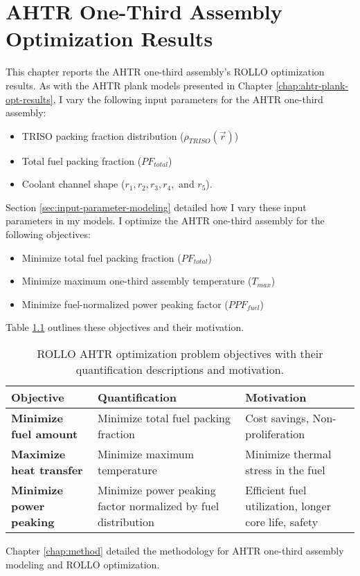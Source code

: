 \chapter{AHTR One-Third Assembly Optimization Results}
\glsresetall
\label{chap:ahtr-assem-opt-results}
This chapter reports the \gls{AHTR} one-third assembly's \gls{ROLLO} optimization 
results. 
As with the \gls{AHTR} plank models presented in Chapter
\ref{chap:ahtr-plank-opt-results}, I vary the following input parameters for the 
\gls{AHTR} one-third assembly:
\begin{itemize}
    \item \gls{TRISO} packing fraction distribution ($\rho_{TRISO}(\vec{r})$)
    \item Total fuel packing fraction ($PF_{total}$)
    \item Coolant channel shape ($r_1, r_2, r_3, r_4,$ and $r_5$).
\end{itemize} 
Section \ref{sec:input-parameter-modeling} detailed how I vary these 
input parameters in my models. 
I optimize the \gls{AHTR} one-third assembly for the following 
objectives:
\begin{itemize}
    \item Minimize total fuel packing fraction ($PF_{total}$)
    \item Minimize maximum one-third assembly temperature ($T_{max}$)
    \item Minimize fuel-normalized power peaking factor ($PPF_{fuel}$)
\end{itemize} 
Table \ref{tab:objectives-3} outlines these objectives and their motivation.
\begin{table}[htbp]
    \centering
    \onehalfspacing
    \caption{\acrfull{ROLLO} \acrfull{AHTR} optimization problem objectives with 
    their quantification descriptions and motivation.}
	\label{tab:objectives-3}
    \footnotesize
    \begin{tabular}{p{4.5cm}|p{5cm}p{5cm}}
    \hline 
    \textbf{Objective}& \textbf{Quantification}& \textbf{Motivation} \\
    \hline
    \textbf{Minimize fuel amount} & Minimize total fuel packing \newline fraction 
    & Cost savings, Non-proliferation \\ 
    \hline
    \textbf{Maximize heat transfer} & Minimize maximum temperature 
    & Minimize thermal stress in the fuel \\
    \hline
    \textbf{Minimize power peaking} & Minimize power peaking factor normalized by fuel distribution 
    & Efficient fuel utilization, longer core life, safety\\
    \hline
    \end{tabular}
\end{table}
Chapter \ref{chap:method} detailed the methodology for \gls{AHTR} one-third 
assembly modeling and \gls{ROLLO} optimization. 

